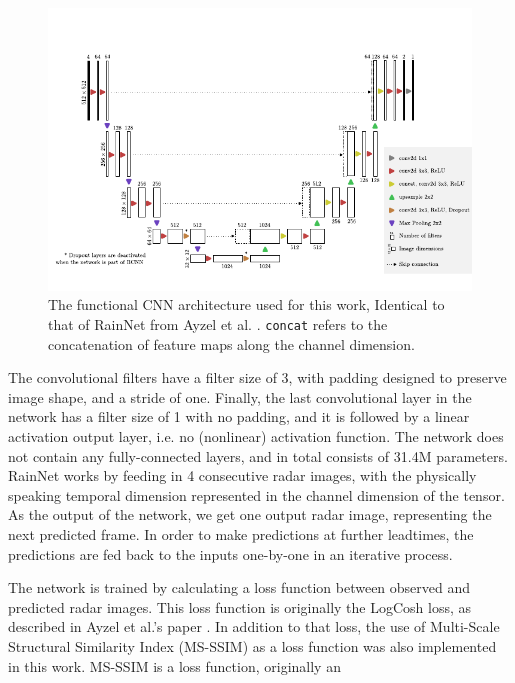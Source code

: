 \begin{figure}[h]
	\centering
	\includegraphics[scale=1]{images/rainnet_arch/rainnet_arch}
	\caption{The functional CNN architecture used for this work, Identical to that of RainNet from Ayzel et al. \cite{ayzel_rainnet_nodate}. \texttt{concat} refers to the concatenation of feature maps along the channel dimension.}
	\label{fig:rainnet}
\end{figure}

The convolutional filters have a filter size of 3, with padding designed to preserve image shape, and a stride of one. Finally, the last convolutional layer in the network has a filter size of 1 with no padding, and it is followed by a linear activation output layer, i.e. no (nonlinear) activation function. The network does not contain any fully-connected layers, and in total consists of 31.4M parameters. RainNet works by feeding in 4 consecutive radar images, with the physically speaking temporal dimension represented in the channel dimension of the tensor. As the output of the network, we get one output radar image, representing the next predicted frame. In order to make predictions at further leadtimes, the predictions are fed back to the inputs one-by-one in an iterative process. 

The network is trained by calculating a loss function between observed and predicted radar images. This loss function is originally the LogCosh loss, as described in Ayzel et al.'s paper \cite{ayzel_rainnet_nodate}. In addition to that loss, the use of Multi-Scale Structural Similarity Index (MS-SSIM) \cite{wang_multiscale_2003} as a loss function was also implemented in this work. MS-SSIM is a loss function, originally an 

